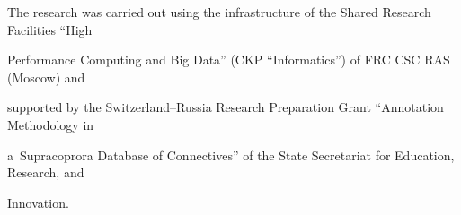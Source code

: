 












\Ack


\noindent


The research was carried out using the infrastructure of the Shared Research Facilities ``High 


Performance Computing and Big Data'' (CKP ``Informatics'') of FRC CSC RAS (Moscow) and 


supported by the Switzerland--Russia Research Preparation Grant ``Annotation Methodology in 


a~Supracoprora Database of Connectives'' of the State Secretariat for Education, Research, and 


Innovation.










\renewcommand{\bibname}{\protect\rmfamily References}








